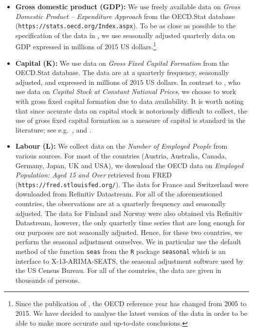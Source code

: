 \documentclass[12pt]{article}
\begin{document}
\begin{itemize}[leftmargin=0.5cm]
\item \textbf{Gross domestic product ($\boldsymbol{GDP}$):} We use freely available data on \textit{Gross Domestic Product -- Expenditure Approach} from the OECD.Stat %
database (\texttt{https://stats.\linebreak oecd.org/Index.aspx}). To be as close as possible to the specification of the data in \cite{Zhang2012}, we use seasonally adjusted quarterly data on GDP expressed in millions of 2015 US dollars.\footnote{Since the publication of \cite{Zhang2012}, the OECD reference year has changed from 2005 to 2015. We have decided to analyse the latest version of the data in order to be able to make more accurate and up-to-date conclusions.} 

\item \textbf{Capital ($\boldsymbol{K}$):} We use data on \textit{Gross Fixed Capital Formation} from the OECD.Stat %
database. The data are at a quarterly frequency, seasonally adjusted, and expressed in millions of $2015$ US dollars. In contrast to \cite{Zhang2012}, who use data on \textit{Capital Stock at Constant National Prices}, we choose to work with gross fixed capital formation due to data availability. It is worth noting that since accurate data on capital stock is notoriously difficult to collect, the use of gross fixed capital formation as a measure of capital is standard in the literature; see e.g.\ \cite{Sharma1994}, \cite{Lee2002} and \cite{Lee2005}.

\item \textbf{Labour ($\boldsymbol{L}$):} We collect data on the \textit{Number of Employed People} from various sources. For most of the countries (Austria, Australia, Canada, Germany, Japan, UK and USA), we download the OECD data on \textit{Employed Population: Aged 15 and Over} retrieved from FRED (\texttt{https://fred.stlouisfed.org/}). %
The data for France and Switzerland were downloaded from Refinitiv Datastream. For all of the aforementioned countries, the observations are at a quarterly frequency and seasonally adjusted. The data for Finland and Norway were also obtained via Refinitiv Datastream, however, the only quarterly time series that are long enough for our purposes are not seasonally adjusted. Hence, for these two countries, we perform the seasonal adjustment ourselves. We in particular use the default method of the function \verb|seas| from the \verb|R| package \verb|seasonal| \citep*{Sax2018} which is an interface to X-13-ARIMA-SEATS, the seasonal adjustment software used by the US Census Bureau. 
For all of the countries, the data are given in thousands of persons.


\end{itemize}
\end{document}
